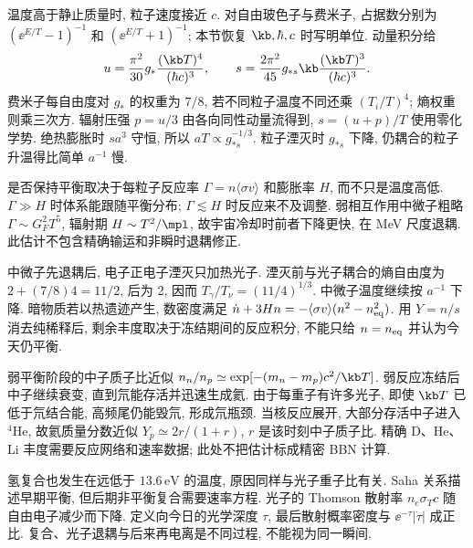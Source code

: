 \label{ch:thermal}
温度高于静止质量时, 粒子速度接近 $c$. 对自由玻色子与费米子, 占据数分别为 $(\ee^{E/T}-1)^{-1}$ 和 $(\ee^{E/T}+1)^{-1}$; 本节恢复 $\kb,\hbar,c$ 时写明单位. 动量积分给
\begin{equation}
u=\frac{\pi^2}{30}g_*\frac{(\kb T)^4}{(\hbar c)^3},\qquad
s=\frac{2\pi^2}{45}g_{*s}\kb\frac{(\kb T)^3}{(\hbar c)^3}.
\end{equation}
费米子每自由度对 $g_*$ 的权重为 $7/8$, 若不同粒子温度不同还乘 $(T_i/T)^4$; 熵权重则乘三次方. 辐射压强 $p=u/3$ 由各向同性动量流得到, $s=(u+p)/T$ 使用零化学势. 绝热膨胀时 $sa^3$ 守恒, 所以 $aT\propto g_{*s}^{-1/3}$. 粒子湮灭时 $g_{*s}$ 下降, 仍耦合的粒子升温得比简单 $a^{-1}$ 慢.

是否保持平衡取决于每粒子反应率 $\Gamma=n\langle\sigma v\rangle$ 和膨胀率 $H$, 而不只是温度高低. $\Gamma\gg H$ 时体系能跟随平衡分布; $\Gamma\lesssim H$ 时反应来不及调整. 弱相互作用中微子粗略 $\Gamma\sim G_F^2T^5$, 辐射期 $H\sim T^2/\mpl$, 故宇宙冷却时前者下降更快, 在 MeV 尺度退耦. 此估计不包含精确输运和非瞬时退耦修正.

中微子先退耦后, 电子正电子湮灭只加热光子. 湮灭前与光子耦合的熵自由度为 $2+(7/8)4=11/2$, 后为 2, 因而 $T_\gamma/T_\nu=(11/4)^{1/3}$. 中微子温度继续按 $a^{-1}$ 下降. 暗物质若以热遗迹产生, 数密度满足 $\dot n+3Hn=-\langle\sigma v\rangle(n^2-n_{\rm eq}^2)$. 用 $Y=n/s$ 消去纯稀释后, 剩余丰度取决于冻结期间的反应积分, 不能只给 $n=n_{\rm eq}$ 并认为今天仍平衡.

弱平衡阶段的中子质子比近似 $n_n/n_p\simeq\exp[-(m_n-m_p)c^2/\kb T]$. 弱反应冻结后中子继续衰变, 直到氘能存活并迅速生成氦. 由于每重子有许多光子, 即使 $\kb T$ 已低于氘结合能, 高频尾仍能毁氘, 形成氘瓶颈. 当核反应展开, 大部分存活中子进入 ${}^4\mathrm{He}$, 故氦质量分数近似 $Y_p\simeq2r/(1+r)$, $r$ 是该时刻中子质子比. 精确 D、He、Li 丰度需要反应网络和速率数据; 此处不把估计标成精密 BBN 计算.

氢复合也发生在远低于 $13.6\,\mathrm{eV}$ 的温度, 原因同样与光子重子比有关. Saha 关系描述早期平衡, 但后期非平衡复合需要速率方程. 光子的 Thomson 散射率 $n_e\sigma_Tc$ 随自由电子减少而下降. 定义向今日的光学深度 $\tau$, 最后散射概率密度与 $\ee^{-\tau}|\dot\tau|$ 成正比. 复合、光子退耦与后来再电离是不同过程, 不能视为同一瞬间.

